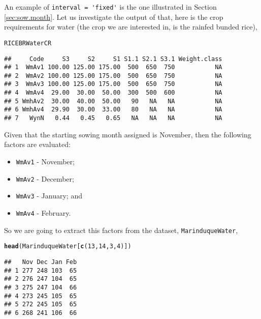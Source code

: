 \documentclass[11pt,fleqn]{article}\usepackage[]{graphicx}\usepackage[]{color}
\makeatletter
\newcommand{\hlnum}[1]{\textcolor[rgb]{0.686,0.059,0.569}{#1}}%
\newcommand{\hlstd}[1]{\textcolor[rgb]{0.345,0.345,0.345}{#1}}%
\newcommand{\hlkwd}[1]{\textcolor[rgb]{0.737,0.353,0.396}{\textbf{#1}}}%
\newenvironment{kframe}{%
 \def\at@end@of@kframe{}%
 \ifinner\ifhmode%
  \def\at@end@of@kframe{\end{minipage}}%
  \begin{minipage}{\columnwidth}%
 \fi\fi%
 \def\FrameCommand##1{\hskip\@totalleftmargin \hskip-\fboxsep
 \colorbox{shadecolor}{##1}\hskip-\fboxsep
     \hskip-\linewidth \hskip-\@totalleftmargin \hskip\columnwidth}%
 \MakeFramed {\advance\hsize-\width
   \@totalleftmargin\z@ \linewidth\hsize
   \@setminipage}}%
 {\par\unskip\endMakeFramed%
 \at@end@of@kframe}
\newenvironment{knitrout}{}{} %
\makeatother
\begin{document}
An example of \verb|interval = 'fixed'| is the one illustrated in Section \ref{sec:sow.month}. Let us investigate the output of that, here is the crop requirements for water (the crop we are interested in, is the rainfed bunded rice),
\begin{knitrout}
\color{fgcolor}\begin{kframe}
\begin{alltt}
\hlstd{RICEBRWaterCR}
\end{alltt}
\begin{verbatim}
##     Code     S3     S2     S1 S1.1 S2.1 S3.1 Weight.class
## 1  WmAv1 100.00 125.00 175.00  500  650  750           NA
## 2  WmAv2 100.00 125.00 175.00  500  650  750           NA
## 3  WmAv3 100.00 125.00 175.00  500  650  750           NA
## 4  WmAv4  29.00  30.00  50.00  300  500  600           NA
## 5 WmhAv2  30.00  40.00  50.00   90   NA   NA           NA
## 6 WmhAv4  29.90  30.00  33.00   80   NA   NA           NA
## 7   WynN   0.44   0.45   0.65   NA   NA   NA           NA
\end{verbatim}
\end{kframe}
\end{knitrout}
Given that the starting sowing month assigned is November, then the following factors are evaluated: 
\begin{itemize}
\item \verb|WmAv1| - November;
\item \verb|WmAv2| - December;
\item \verb|WmAv3| - January; and
\item \verb|WmAv4| - February.
\end{itemize}
So we are going to extract this factors from the dataset, \verb|MarinduqueWater|,
\begin{knitrout}
\color{fgcolor}\begin{kframe}
\begin{alltt}
\hlkwd{head}\hlstd{(MarinduqueWater[}\hlkwd{c}\hlstd{(}\hlnum{13}\hlstd{,} \hlnum{14}\hlstd{,} \hlnum{3}\hlstd{,} \hlnum{4}\hlstd{)])}
\end{alltt}
\begin{verbatim}
##   Nov Dec Jan Feb
## 1 277 248 103  65
## 2 276 247 104  65
## 3 275 247 104  66
## 4 273 245 105  65
## 5 272 245 105  65
## 6 268 241 106  66
\end{verbatim}
\end{kframe}
\end{knitrout}
\end{document}

